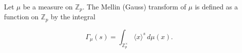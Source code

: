 Let $\mu$ be a measure on $\mathbb{Z}_p$. The Mellin (Gauss) transform of $\mu$ is defined as a function on $\mathbb{Z}_p$ by the integral

$$\Gamma_{\mu}(s) = \int_{\mathbb{Z}_p^{\times}} \langle x \rangle^{s} \, d\mu(x).$$
